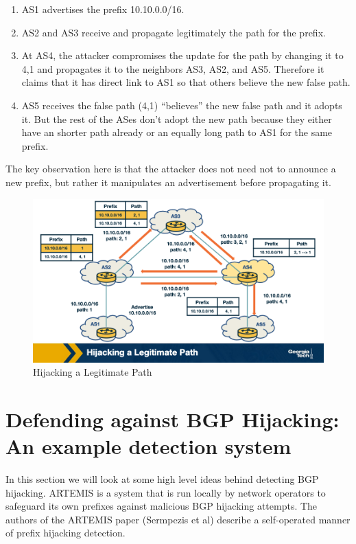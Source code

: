 \documentclass[11pt]{article}
\begin{document}
\begin{enumerate}
\item AS1 advertises the prefix 10.10.0.0/16.
\item AS2 and AS3 receive and propagate legitimately the path for the prefix.
\item At AS4, the attacker compromises the update for the path by changing it to 4,1 and propagates it to the neighbors AS3, AS2, and AS5. Therefore it claims that it has direct link to AS1 so that others believe the new false path.
\item AS5 receives the false path (4,1)  “believes” the new false path and it adopts it. But the rest of the ASes don’t adopt the new path because they either have an shorter path already or an equally long path to AS1 for the same prefix.
\end{enumerate}

The key observation here is that the attacker does not need not to announce a new prefix, but rather it manipulates an advertisement before propagating it.

\begin{figure}[htbp]
\centering
\includegraphics[width=.9\linewidth]{./MD_Figures/9_bgp_attacks_hijacking_path_1.png}
\caption{\label{fig:org21b1afd}Hijacking a Legitimate Path}
\end{figure}

\section{Defending against BGP Hijacking: An example detection system}
\label{sec:org18cd761}

In this section we will look at some high level ideas behind detecting BGP hijacking. ARTEMIS is a system that is run locally by network operators to safeguard its own prefixes against malicious BGP hijacking attempts. The authors of the ARTEMIS paper (Sermpezis et al) describe a self-operated manner of prefix hijacking detection.
\end{document}
